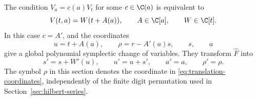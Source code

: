 \begin{proposition}
\label{prop:translation-exception}
The condition $V_a=c(a)V_t$ for some $c\in\C(a)$ is equivalent to
\begin{equation}
 V(t,a)=W(t+A(a)),\qquad
 A\in\C[a],\qquad W\in\C[t].
 \label{eq:translation-potential}
\end{equation}
In this case $c=A'$, and the coordinates
\begin{equation}
 u=t+A(a),\qquad \rho=r-A'(a)s,\qquad s,\qquad a
 \label{eq:translation-coordinates}
\end{equation}
give a global polynomial symplectic change of variables. They transform
$\widehat F$ into
\begin{equation}
 s'=s+W'(u),\qquad u'=u+s',\qquad a'=a,\qquad\rho'=\rho.
 \label{eq:decoupled-lift}
\end{equation}
The symbol $\rho$ in this section denotes the coordinate in
\eqref{eq:translation-coordinates}, independently of the finite digit
permutation used in Section~\ref{sec:hilbert-series}.
\end{proposition}

